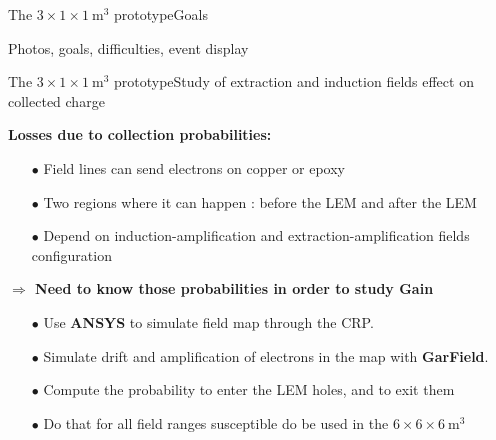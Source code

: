 \documentclass[10pt]{beamer}
\begin{document}
    \begin{frame}{The \texorpdfstring{$3 \times 1 \times \SI{1}{\meter\cubed}$}{311} prototype}{Goals}
    	\begin{scriptsize}
    	\end{scriptsize}
    	Photos, goals, difficulties, event display
    \end{frame}
    
    \begin{frame}{The \texorpdfstring{$3 \times 1 \times \SI{1}{\meter\cubed}$}{311} prototype}{Study of extraction and induction fields effect on collected charge}
    	\begin{scriptsize}
    		\begin{minipage}{0.48\textwidth}
    			\textbf{Losses due to collection probabilities:}
    			\begin{itemize}
    				\item[$\bullet$] Field lines can send electrons on copper or epoxy
    				\item[$\bullet$] Two regions where it can happen : before the LEM and after the LEM
    				\item[$\bullet$] Depend on induction-amplification and extraction-amplification fields configuration
    			\end{itemize}
    			\textbf{$\Rightarrow$ Need to know those probabilities in order to study Gain}
    			\begin{itemize}
    				\item[$\bullet$] Use \textbf{ANSYS} to simulate field map through the CRP.
    				\item[$\bullet$] Simulate drift and amplification of electrons in the map with \textbf{GarField}.
    				\item[$\bullet$] Compute the probability to enter the LEM holes, and to exit them
    				\item[$\bullet$] Do that for all field ranges susceptible do be used in  the $6 \times 6 \times \SI{6}{\meter\cubed}$
    			\end{itemize}
    		\end{minipage}
    		\begin{minipage}{0.48\textwidth}
    			\centering

\end{minipage}
\end{scriptsize}
\end{frame}
\end{document}
